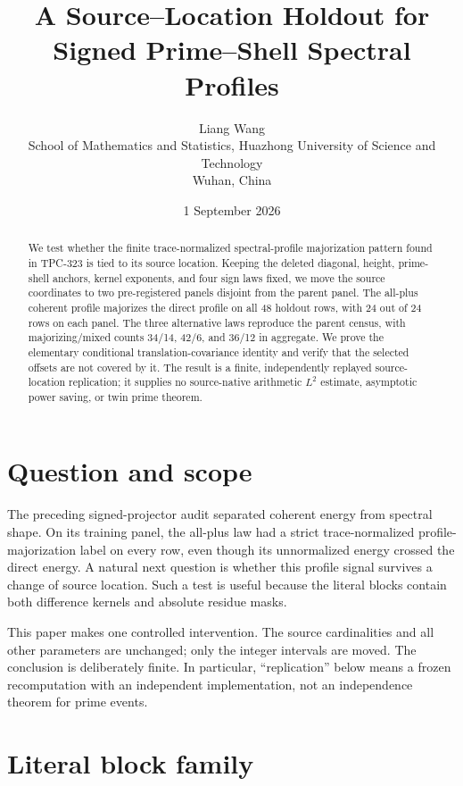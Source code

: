 \documentclass[10pt]{article}
\title{A Source--Location Holdout for Signed Prime--Shell Spectral Profiles}
\author{Liang Wang\\
School of Mathematics and Statistics, Huazhong University of Science and Technology\\
Wuhan, China}
\date{1 September 2026}
\begin{document}
\maketitle

\begin{abstract}
We test whether the finite trace-normalized spectral-profile
majorization pattern found in TPC-323 is tied to its source location.
Keeping the deleted diagonal, height, prime-shell anchors, kernel
exponents, and four sign laws fixed, we move the source coordinates to two
pre-registered panels disjoint from the parent panel.  The all-plus coherent
profile majorizes the direct profile on all 48 holdout rows, with 24 out of
24 rows on each panel.  The three alternative laws reproduce the parent
census, with majorizing/mixed counts 34/14, 42/6, and 36/12 in aggregate.
We prove the elementary conditional translation-covariance identity and
verify that the selected offsets are not covered by it.  The result is a
finite, independently replayed source-location replication; it supplies no
source-native arithmetic $L^2$ estimate, asymptotic power saving, or twin
prime theorem.
\end{abstract}

\section{Question and scope}

The preceding signed-projector audit separated coherent energy from spectral
shape.  On its training panel, the all-plus law had a strict
trace-normalized profile-majorization label on every row, even though its
unnormalized energy crossed the direct energy.  A natural next question is
whether this profile signal survives a change of source location.  Such a
test is useful because the literal blocks contain both difference kernels and
absolute residue masks.

This paper makes one controlled intervention.  The source cardinalities and
all other parameters are unchanged; only the integer intervals are moved.
The conclusion is deliberately finite.  In particular, ``replication''
below means a frozen recomputation with an independent implementation, not an
independence theorem for prime events.

\section{Literal block family}
\end{document}
